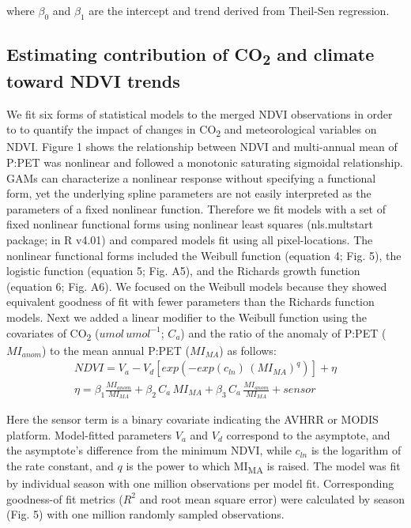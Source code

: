 \documentclass[gc, manuscript]{copernicus}
\begin{document}
where \(\beta_0\) and \(\beta_1\) are the intercept and trend derived
from Theil-Sen regression.

\subsection{\texorpdfstring{Estimating contribution of
CO\textsubscript{2} and climate toward NDVI
trends}{Estimating contribution of CO2 and climate toward NDVI trends}}

We fit six forms of statistical models to the merged NDVI observations
in order to to quantify the impact of changes in CO\textsubscript{2} and
meteorological variables on NDVI. Figure 1 shows the relationship
between NDVI and multi-annual mean of P:PET was nonlinear and followed a
monotonic saturating sigmoidal relationship. GAMs can characterize a
nonlinear response without specifying a functional form, yet the
underlying spline parameters are not easily interpreted as the
parameters of a fixed nonlinear function. Therefore we fit models with a
set of fixed nonlinear functional forms using nonlinear least squares
(nls.multstart package; \citet{padfield_matheson20} in R v4.01) and
compared models fit using all pixel-locations. The nonlinear functional
forms included the Weibull function (equation 4; Fig. 5), the logistic
function (equation 5; Fig. A5), and the Richards growth function
(equation 6; Fig. A6). We focused on the Weibull models because they
showed equivalent goodness of fit with fewer parameters than the
Richards function models. Next we added a linear modifier to the Weibull
function using the covariates of CO\textsubscript{2}
(\(umol\,umol^{-1}\); \(C_{a}\)) and the ratio of the anomaly of P:PET
(\(MI_{anom}\)) to the mean annual P:PET (\(MI_{MA}\)) as follows:
\begin{align}
NDVI=V_a-V_d[exp(-exp(c_{ln})\,(MI_{MA})^{q})]+\eta\\
\eta = \beta_{1}\frac{MI_{anom}}{MI_{MA}}+\beta_{2}\,C_{a}\,MI_{MA} +\beta_{3}\,C_{a}\,\frac{MI_{anom}}{MI_{MA}}+sensor\nonumber
\end{align}

Here the sensor term is a binary covariate indicating the AVHRR or MODIS
platform. Model-fitted parameters \(V_a\) and \(V_d\) correspond to the
asymptote, and the asymptote's difference from the minimum NDVI, while
\(c_{ln}\) is the logarithm of the rate constant, and \(q\) is the power
to which MI\textsubscript{MA} is raised. The model was fit by individual
season with one million observations per model fit. Corresponding
goodness-of fit metrics (\(R^2\) and root mean square error) were
calculated by season (Fig. 5) with one million randomly sampled
observations.
\end{document}
